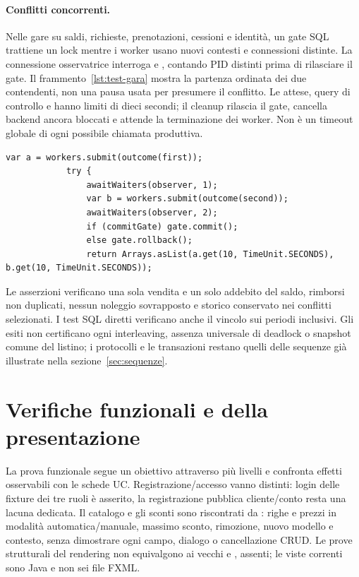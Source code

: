 \paragraph{Conflitti concorrenti.}
Nelle gare su saldi, richieste, prenotazioni, cessioni e identità, un gate
SQL trattiene un lock mentre i worker usano nuovi contesti e connessioni
distinte. La connessione osservatrice interroga 
e , contando PID distinti prima di rilasciare il gate.
Il frammento~\ref{lst:test-gara} mostra la partenza ordinata dei due
contendenti, non una pausa usata per presumere il conflitto.
Le attese, query di controllo e  hanno limiti di dieci
secondi; il cleanup rilascia il gate, cancella backend ancora bloccati
e attende la terminazione dei worker. Non è un timeout globale di ogni
possibile chiamata produttiva.

\noindent\begin{minipage}{\linewidth}
\begin{lstlisting}[firstnumber=301,caption={\code{PurchaseConcurrencyIntegrationTest.java}: estratto della prova.},label=lst:test-gara]
            var a = workers.submit(outcome(first));
            try {
                awaitWaiters(observer, 1);
                var b = workers.submit(outcome(second));
                awaitWaiters(observer, 2);
                if (commitGate) gate.commit();
                else gate.rollback();
                return Arrays.asList(a.get(10, TimeUnit.SECONDS), b.get(10, TimeUnit.SECONDS));
\end{lstlisting}
\end{minipage}

Le asserzioni verificano una sola vendita e un solo addebito del saldo,
rimborsi non duplicati, nessun noleggio sovrapposto e storico conservato
nei conflitti selezionati. I test SQL diretti verificano anche il vincolo
 sui periodi inclusivi. Gli esiti non certificano ogni
interleaving, assenza universale di deadlock o snapshot comune del listino;
i protocolli e le transazioni restano quelli delle sequenze già illustrate
nella sezione~\ref{sec:sequenze}.

\section{Verifiche funzionali e della presentazione}\label{sec:test-ui}
La prova funzionale segue un obiettivo attraverso più livelli e confronta
effetti osservabili con le schede UC. Registrazione/accesso vanno distinti:
login delle fixture dei tre ruoli è asserito, la registrazione pubblica
cliente/conto resta una lacuna dedicata. Il catalogo e gli sconti sono
riscontrati da : righe e prezzi in
modalità automatica/manuale, massimo sconto, rimozione, nuovo modello e
contesto, senza dimostrare ogni campo, dialogo o cancellazione CRUD.
Le prove strutturali del rendering non equivalgono ai vecchi
 e , assenti; le viste correnti
sono Java e non sei file FXML.

